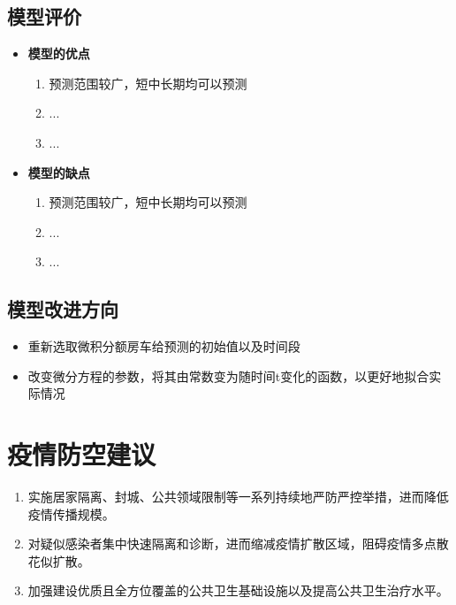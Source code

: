 \documentclass[UTF8]{ctexart}
\begin{document}
		\subsection{模型评价}
		\begin{itemize}
			\setlength{\parsep}{0ex} 
			

			\item \textbf{模型的优点}
			\begin{enumerate}[(1)]
			\item 预测范围较广，短中长期均可以预测
			\item ... 
			\item ...
			\end{enumerate}

			\item \textbf{模型的缺点}
			\begin{enumerate}[(1)]
			\item 预测范围较广，短中长期均可以预测
			\item ... 
			\item ...
			\end{enumerate}
		\end{itemize}

		\subsection{模型改进方向}
		\begin{itemize}
		\item 重新选取微积分额房车给预测的初始值以及时间段
		\item 改变微分方程的参数，将其由常数变为随时间t变化的函数，以更好地拟合实际情况
		\end{itemize}


\newpage


	\section{疫情防空建议}
		\begin{enumerate}[1)]
		\item 实施居家隔离、封城、公共领域限制等一系列持续地严防严控举措，进而降低疫情传播规模。
		\item 对疑似感染者集中快速隔离和诊断，进而缩减疫情扩散区域，阻碍疫情多点散花似扩散。
  		\item 加强建设优质且全方位覆盖的公共卫生基础设施以及提高公共卫生治疗水平。
		\end{enumerate}
\end{document}
